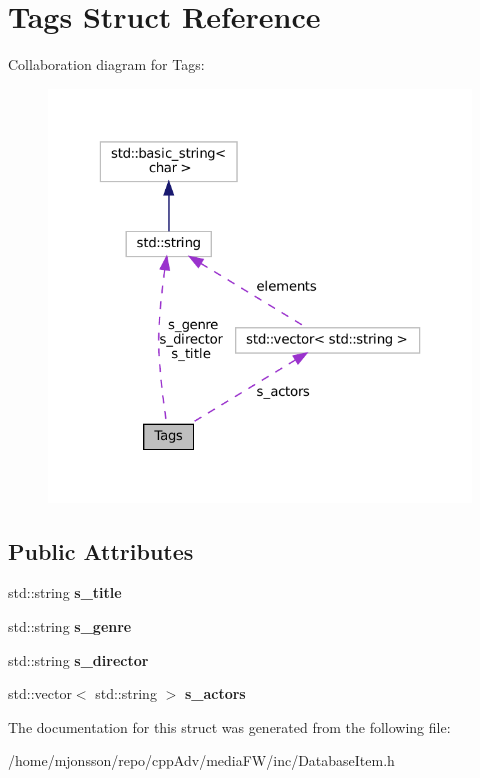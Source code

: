 \hypertarget{structTags}{}\section{Tags Struct Reference}
\label{structTags}


Collaboration diagram for Tags\+:
\nopagebreak
\begin{figure}[H]
\begin{center}
\leavevmode
\includegraphics[width=323pt]{structTags__coll__graph}
\end{center}
\end{figure}
\subsection*{Public Attributes}
\begin{DoxyCompactItemize}
\item 
\mbox{\label{structTags_a0af72a04b35ff5bfb11e9e602a25697c}} 
std\+::string {\bfseries s\+\_\+title}
\item 
\mbox{\label{structTags_ab983fc193a143dbd70b38a8e36f90ffb}} 
std\+::string {\bfseries s\+\_\+genre}
\item 
\mbox{\label{structTags_abd09416d0ce431b76adfc931b26738d9}} 
std\+::string {\bfseries s\+\_\+director}
\item 
\mbox{\label{structTags_a94e73b49ee3c2acf33cc109a1411e45a}} 
std\+::vector$<$ std\+::string $>$ {\bfseries s\+\_\+actors}
\end{DoxyCompactItemize}


The documentation for this struct was generated from the following file\+:\begin{DoxyCompactItemize}
\item 
/home/mjonsson/repo/cpp\+Adv/media\+F\+W/inc/Database\+Item.\+h\end{DoxyCompactItemize}
